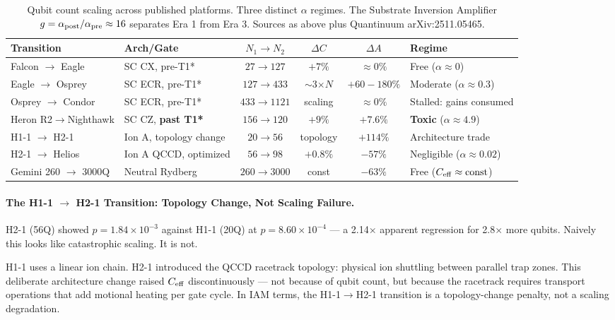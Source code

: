 \documentclass[12pt,a4paper]{article}
\begin{document}
\begin{table}[h]
\centering
\caption{Qubit count scaling across published platforms. Three distinct
$\alpha$ regimes. The Substrate Inversion Amplifier
$g = \alpha_{\rm post}/\alpha_{\rm pre} \approx 16$ separates Era 1 from Era 3.
Sources as above plus Quantinuum arXiv:2511.05465.}
\label{tab:scaling}
\begin{tabular}{llcccl}
\toprule
\textbf{Transition} & \textbf{Arch/Gate} & \textbf{$N_1 \to N_2$}
  & \textbf{$\Delta C$} & \textbf{$\Delta A$} & \textbf{Regime} \\
\midrule
Falcon $\to$ Eagle   & SC CX, pre-T1*         & $27\to127$   & $+7\%$   & $\approx0\%$ & Free ($\alpha\approx0$) \\
Eagle $\to$ Osprey   & SC ECR, pre-T1*        & $127\to433$  & $\sim$3$\times N$ & $+60{-}180\%$ & Moderate ($\alpha\approx0.3$) \\
Osprey $\to$ Condor  & SC ECR, pre-T1*        & $433\to1121$ & scaling  & $\approx0\%$ & Stalled: gains consumed \\
Heron R2$\to$Nighthawk & SC CZ, \textbf{past T1*} & $156\to120$ & $+9\%$ & $+7.6\%$ & \textbf{Toxic} ($\alpha\approx4.9$) \\
H1-1 $\to$ H2-1      & Ion A, topology change & $20\to56$    & topology & $+114\%$ & Architecture trade \\
H2-1 $\to$ Helios    & Ion A QCCD, optimized  & $56\to98$    & $+0.8\%$ & $-57\%$  & Negligible ($\alpha\approx0.02$) \\
Gemini 260 $\to$ 3000Q & Neutral Rydberg      & $260\to3000$ & const    & $-63\%$  & Free ($C_{\rm eff}\approx{\rm const}$) \\
\bottomrule
\end{tabular}
\end{table}

\paragraph{The H1-1 $\to$ H2-1 Transition: Topology Change, Not Scaling Failure.}

H2-1 (56Q) showed $p = 1.84\times10^{-3}$ against H1-1 (20Q) at
$p = 8.60\times10^{-4}$ --- a 2.14$\times$ apparent regression for
2.8$\times$ more qubits. Naively this looks like catastrophic scaling.
It is not.

H1-1 uses a linear ion chain. H2-1 introduced the QCCD racetrack
topology: physical ion shuttling between parallel trap zones. This
deliberate architecture change raised $C_{\rm eff}$ discontinuously ---
not because of qubit count, but because the racetrack requires
transport operations that add motional heating per gate cycle. In IAM
terms, the H1-1$\to$H2-1 transition is a topology-change penalty, not
a scaling degradation.
\end{document}
